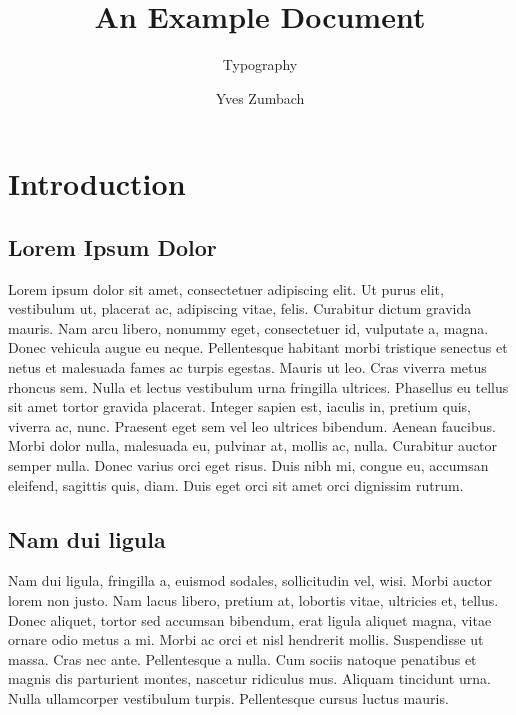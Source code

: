 \documentclass[portable]{yReport}
\author{Yves Zumbach}
\subtitle{Typography}
\title{An Example Document}
\begin{document}
	
	
	\chapter{Introduction}
	
	\section{Lorem Ipsum Dolor}
	Lorem ipsum dolor sit amet, consectetuer adipiscing elit. Ut purus elit,
	vestibulum ut, placerat ac, adipiscing vitae, felis. Curabitur dictum gravida
	mauris. Nam arcu libero, nonummy eget, consectetuer id, vulputate a, magna.
	Donec vehicula augue eu neque. Pellentesque habitant morbi tristique
	senectus et netus et malesuada fames ac turpis egestas\sideNote[white]{\lipsum[3]}. Mauris ut leo.
	Cras viverra metus rhoncus sem. Nulla et lectus vestibulum urna fringilla
	ultrices. Phasellus eu tellus sit amet tortor gravida placerat. Integer sapien
	est, iaculis in, pretium quis, viverra ac, nunc. Praesent eget sem vel leo ultrices bibendum. Aenean faucibus. Morbi dolor nulla, malesuada eu, pulvinar
	at, mollis ac, nulla. Curabitur auctor semper nulla. Donec varius orci eget
	risus. Duis nibh mi, congue eu, accumsan eleifend, sagittis quis, diam. Duis
	eget orci sit amet orci dignissim rutrum.
	
	\section{Nam dui ligula}
	
	Nam dui ligula, fringilla a, euismod sodales, sollicitudin vel, wisi. Morbi auctor lorem non justo. Nam lacus libero, pretium at, lobortis vitae, ultricies et, tellus. Donec aliquet, tortor sed accumsan bibendum, erat ligula aliquet magna, vitae ornare odio metus a mi. Morbi ac orci et nisl hendrerit mollis. Suspendisse ut massa. Cras nec ante. Pellentesque a nulla. Cum sociis natoque penatibus et magnis dis parturient montes, nascetur ridiculus mus. Aliquam tincidunt urna. Nulla ullamcorper vestibulum turpis. Pellentesque cursus luctus mauris.
	
\end{document}
